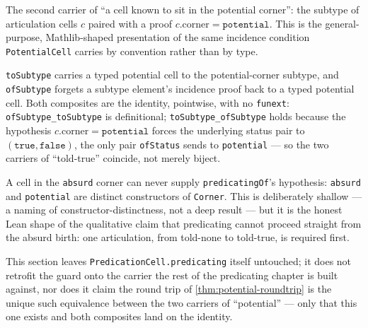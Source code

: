 \begin{proposition}\label{thm:potential-subtype}\leanok{}
The second carrier of ``a cell known to sit in the potential corner'': the
subtype of articulation cells \(c\) paired with a proof
\(c.\mathrm{corner} = \mathtt{potential}\). This is the general-purpose,
Mathlib-shaped presentation of the same incidence condition
\texttt{PotentialCell} carries by convention rather than by type.
\end{proposition}

\begin{theorem}\label{thm:potential-roundtrip}\leanok{}
\texttt{toSubtype} carries a typed potential cell to the potential-corner
subtype, and \texttt{ofSubtype} forgets a subtype element's incidence proof
back to a typed potential cell. Both composites are the identity, pointwise,
with no \texttt{funext}: \texttt{ofSubtype\_toSubtype} is definitional;
\texttt{toSubtype\_ofSubtype} holds because the hypothesis
\(c.\mathrm{corner} = \mathtt{potential}\) forces the underlying status pair
to \((\mathtt{true}, \mathtt{false})\), the only pair \texttt{ofStatus} sends
to \texttt{potential} --- so the two carriers of ``told-true'' coincide, not
merely biject.
\end{theorem}

\begin{proposition}\label{thm:absurd-cannot-predicate}\leanok{}
A cell in the \texttt{absurd} corner can never supply
\texttt{predicatingOf}'s hypothesis: \texttt{absurd} and \texttt{potential}
are distinct constructors of \texttt{Corner}. This is deliberately shallow
--- a naming of constructor-distinctness, not a deep result --- but it is the
honest Lean shape of the qualitative claim that predicating cannot proceed
straight from the absurd birth: one articulation, from told-none to
told-true, is required first.
\end{proposition}

This section leaves \texttt{PredicationCell.predicating} itself untouched;
it does not retrofit the guard onto the carrier the rest of the predicating
chapter is built against, nor does it claim the round trip of
\cref{thm:potential-roundtrip} is the unique such equivalence between the two
carriers of ``potential'' --- only that this one exists and both composites
land on the identity.
